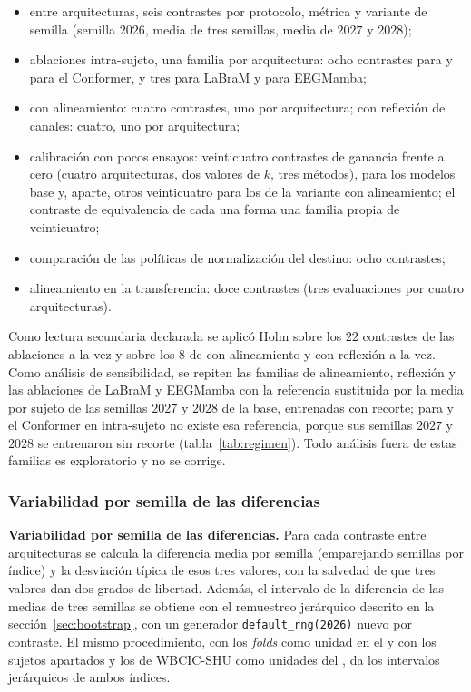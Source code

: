 \begin{itemize}
  \item entre arquitecturas, seis contrastes por protocolo, métrica y variante de semilla
  (semilla $2026$, media de tres semillas, media de $2027$ y $2028$);
  \item ablaciones intra-sujeto, una familia por arquitectura: ocho contrastes para
  \eegnet{} y para el Conformer, y tres para LaBraM y para EEGMamba;
  \item \loso{} con alineamiento: cuatro contrastes, uno por arquitectura; \loso{} con
  reflexión de canales: cuatro, uno por arquitectura;
  \item calibración con pocos ensayos: veinticuatro contrastes de ganancia frente a cero
  (cuatro arquitecturas, dos valores de $k$, tres métodos), para los modelos base y,
  aparte, otros veinticuatro para los de la variante con alineamiento; el contraste de
  equivalencia de cada una forma una familia propia de veinticuatro;
  \item comparación de las políticas de normalización del destino: ocho contrastes;
  \item alineamiento en la transferencia: doce contrastes (tres evaluaciones por cuatro arquitecturas).
\end{itemize}

Como lectura secundaria declarada se aplicó Holm sobre los $22$ contrastes de las
ablaciones a la vez y sobre los $8$ de \loso{} con alineamiento y con reflexión a la vez. Como
análisis de sensibilidad, se repiten las familias de alineamiento, reflexión y las
ablaciones de LaBraM y EEGMamba con la referencia sustituida por la media por sujeto de las
semillas $2027$ y $2028$ de la base, entrenadas con recorte; para \eegnet{} y el Conformer en
intra-sujeto no existe esa referencia, porque sus semillas $2027$ y $2028$ se entrenaron sin
recorte (tabla~\ref{tab:regimen}). Todo análisis fuera de estas familias es exploratorio y no se
corrige.


\subsubsection{Variabilidad por semilla de las diferencias}
\label{sec:variabilidad-metodo}

\textbf{Variabilidad por semilla de las diferencias.} Para cada contraste entre
arquitecturas se calcula la diferencia media por semilla (emparejando semillas por índice) y
la desviación típica de esos tres valores, con la salvedad de que tres valores dan dos
grados de libertad. Además, el intervalo de la diferencia de las medias de tres semillas
se obtiene con el remuestreo jerárquico descrito en la sección~\ref{sec:bootstrap}, con un
generador \texttt{default\_rng(2026)} nuevo por contraste. El mismo procedimiento, con los \textit{folds} \loso{}
como unidad en el \dsi{} y con los sujetos apartados y los de WBCIC-SHU como unidades del
\idp{}, da los intervalos jerárquicos de ambos índices.


